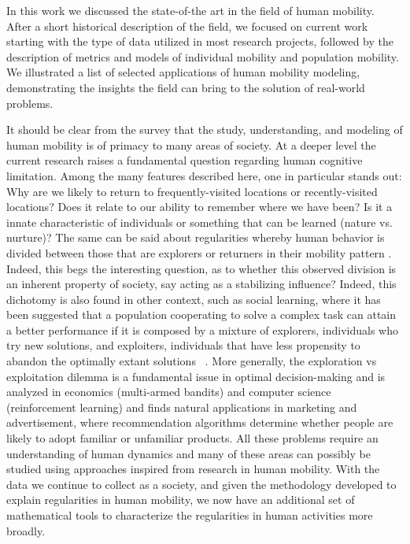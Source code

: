 In this work we discussed the state-of-the art in the field of human mobility. After a short historical description of the field, we focused on current work starting with the type of data utilized in most research projects, followed by the description of metrics and models of individual mobility and population mobility. We illustrated a list of selected applications of human mobility modeling, demonstrating the insights the field can bring to the solution of real-world problems. 

It should be clear from the survey that the study, understanding, and modeling of human mobility is of primacy to many areas of society. At a deeper level the current research raises a fundamental question regarding human cognitive limitation. Among the many features described here, one in particular stands out: Why are we likely to return to frequently-visited locations or recently-visited locations? Does it relate to our ability to remember where we have been? Is it a innate characteristic of individuals or something that can be learned (\ie nature vs. nurture)? The same can be said about regularities whereby human behavior is divided between those that are explorers or returners in their mobility pattern \cite{pappalardo_2015_returners}. Indeed, this begs the interesting question, as to whether this observed division is an inherent property of society, say acting as a stabilizing influence? Indeed, this dichotomy  is also found in other context, such as social learning, where it has been suggested that a population cooperating to solve a complex task can attain a better performance if it is composed by a mixture of explorers, individuals who try new solutions, and exploiters, individuals that have less propensity to abandon the optimally extant solutions~ \cite{rendell_2011_cognitive}. 
More generally, the exploration vs exploitation dilemma is a fundamental issue in optimal decision-making and is analyzed in economics (multi-armed bandits) and computer science (reinforcement learning) and finds natural applications in marketing and advertisement, where recommendation algorithms determine whether people are likely to adopt familiar or unfamiliar products. All these problems require an understanding of human dynamics and many of these areas can possibly be studied using approaches inspired from research in human mobility. With the data we continue to collect as a society, and given the methodology developed to explain regularities in human mobility, we now have an additional set of mathematical tools to characterize the regularities in human activities more broadly.

